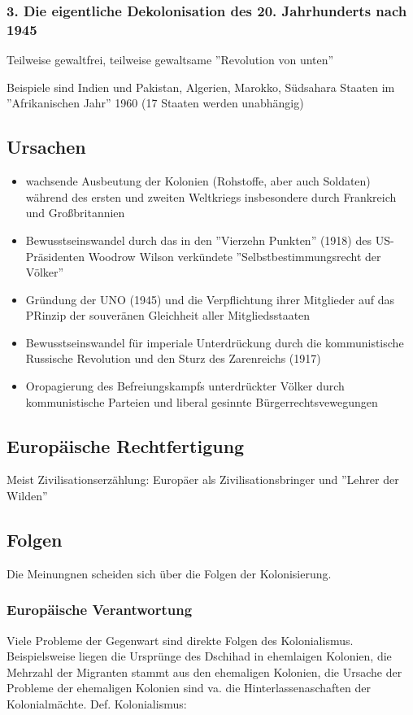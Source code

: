 \documentclass{article}
\begin{document}
\subsubsection*{3. Die eigentliche Dekolonisation des 20. Jahrhunderts nach 1945}
Teilweise gewaltfrei, teilweise gewaltsame ''Revolution von unten'' 

Beispiele sind Indien und Pakistan, Algerien, Marokko, Südsahara Staaten im ''Afrikanischen Jahr'' 1960 (17 Staaten werden unabhängig)

\subsection*{Ursachen}
\begin{itemize}
    \item wachsende Ausbeutung der Kolonien (Rohstoffe, aber auch Soldaten) während des ersten und zweiten
    Weltkriegs insbesondere durch Frankreich und Großbritannien
    \item Bewusstseinswandel durch das in den ''Vierzehn Punkten'' (1918) des US-Präsidenten Woodrow Wilson verkündete
    ''Selbstbestimmungsrecht der Völker''
    \item Gründung der UNO (1945) und die Verpflichtung ihrer Mitglieder auf das PRinzip der souveränen
    Gleichheit aller Mitgliedsstaaten
    \item Bewusstseinswandel für imperiale Unterdrückung durch die kommunistische Russische Revolution und den Sturz
    des Zarenreichs (1917)
    \item Oropagierung des Befreiungskampfs unterdrückter Völker durch kommunistische Parteien und liberal gesinnte Bürgerrechtsvewegungen
\end{itemize}
\subsection*{Europäische Rechtfertigung}
Meist Zivilisationserzählung: Europäer als Zivilisationsbringer und ''Lehrer der Wilden''

\subsection*{Folgen}
Die Meinungnen scheiden sich über die Folgen der Kolonisierung.
\subsubsection*{Europäische Verantwortung}
Viele Probleme der Gegenwart sind direkte Folgen des Kolonialismus. Beispielsweise liegen die Ursprünge des Dschihad in ehemlaigen Kolonien,
die Mehrzahl der Migranten stammt aus den ehemaligen Kolonien, die Ursache der Probleme der ehemaligen Kolonien sind va. die Hinterlassenaschaften
der Kolonialmächte.
Def. Kolonialismus:
\end{document}
